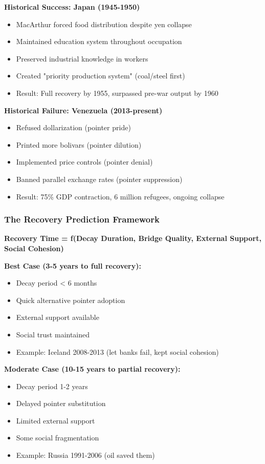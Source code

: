 \documentclass[11pt,oneside]{book}
\begin{document}
\textbf{Historical Success: Japan (1945-1950)}
\begin{itemize}
\item MacArthur forced food distribution despite yen collapse
\item Maintained education system throughout occupation
\item Preserved industrial knowledge in workers
\item Created "priority production system" (coal/steel first)
\item Result: Full recovery by 1955, surpassed pre-war output by 1960
\end{itemize}

\textbf{Historical Failure: Venezuela (2013-present)}
\begin{itemize}
\item Refused dollarization (pointer pride)
\item Printed more bolivars (pointer dilution)
\item Implemented price controls (pointer denial)
\item Banned parallel exchange rates (pointer suppression)
\item Result: 75\% GDP contraction, 6 million refugees, ongoing collapse
\end{itemize}

\subsubsection{The Recovery Prediction Framework}

\textbf{Recovery Time = f(Decay Duration, Bridge Quality, External Support, Social Cohesion)}

\textbf{Best Case (3-5 years to full recovery):}
\begin{itemize}
\item Decay period < 6 months
\item Quick alternative pointer adoption
\item External support available
\item Social trust maintained
\item Example: Iceland 2008-2013 (let banks fail, kept social cohesion)
\end{itemize}

\textbf{Moderate Case (10-15 years to partial recovery):}
\begin{itemize}
\item Decay period 1-2 years
\item Delayed pointer substitution
\item Limited external support
\item Some social fragmentation
\item Example: Russia 1991-2006 (oil saved them)
\end{itemize}
\end{document}
